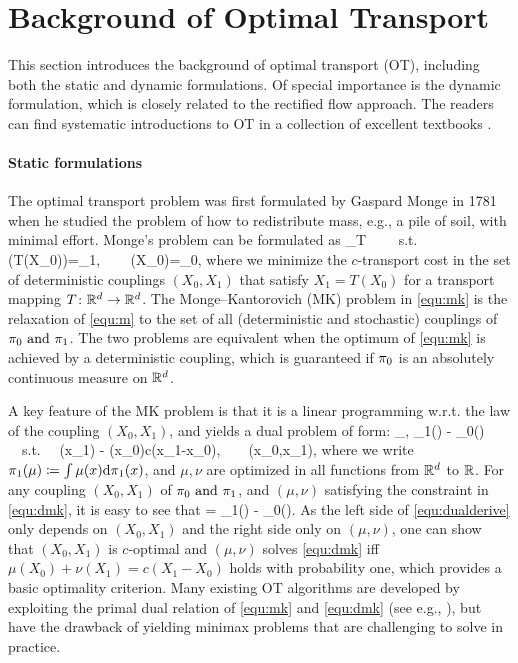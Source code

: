\section{Background of Optimal Transport}
\label{sec:ot}
This section introduces the background of optimal transport (OT), 
including both the static and dynamic formulations.  
Of special importance is the dynamic formulation, 
which is closely related to the rectified flow approach. 
The readers can find systematic introductions to OT in 
a collection of excellent textbooks 
\cite{villani2021topics, figalli2021invitation,   ambrosio2021lectures, peyre2019computational, ollivier2014optimal,
santambrogio2015optimal,
villani2009optimal}.  

\paragraph{Static formulations} 
The optimal transport problem was 
first formulated by 
Gaspard Monge in 1781 when he studied 
 the problem of how to 
 redistribute mass, e.g., a pile of soil, with minimal effort. 
 Monge's problem can be formulated as
 \bbb \label{equ:m}
 \inf_{T}  ~~~~s.t.~~~~ \law(T(X_0))=\tg_1, ~~~ \law(X_0)=\tg_0,
 \eee 
 where we minimize the $c$-transport cost 
 in the set of deterministic couplings $(X_0,X_1)$ that satisfy $X_1 = T(X_0)$ for a transport mapping $T\colon \mathbb{R}^d\to \mathbb{R}^d$. 
The Monge–Kantorovich (MK) problem in \eqref{equ:mk} is the relaxation 
of \eqref{equ:m} to the set of all (deterministic and stochastic) couplings of $\text{${\pi}_0$ and ${\pi}_1$}$.  
The two problems are equivalent when the optimum of \eqref{equ:mk} is achieved by a 
deterministic coupling, which is guaranteed if ${\pi}_0$ is  an absolutely continuous measure on $\mathbb{R}^d$. 

A key feature of the MK problem is that it is
a linear programming w.r.t. the law of the coupling $(X_0,X_1)$, and yields a  dual problem of form: %
\bbb \label{equ:dmk}
\sup_{\mu, \nu} 
\tg_1(\mu)  - \tg_0(\nu) 
~~s.t.~~
 \mu(x_1) - 
\nu(x_0)\leq c(x_1-x_0),~~~~\forall (x_0,x_1),
\eee 
where we write ${\pi}_1(\mu) \coloneqq \int \mu(x) \mathrm{d} {\pi}_1(x)$, and $\mu,\nu$ are optimized in all functions from $\mathbb{R}^d$ to $\mathbb{R}$. 
For any coupling $(X_0,X_1)$ of $\text{${\pi}_0$ and ${\pi}_1$}$, and $(\mu,\nu)$ satisfying the constraint in \eqref{equ:dmk}, it is easy to see that 
\bbb \label{equ:dualderive}
\E[c(X_1-X_0)] 
\geq \E[\mu(X_1) - \nu(X_0)] 
= \tg_1(\mu) - \tg_0(\nu). 
\eee 
As the left side of \eqref{equ:dualderive} 
only depends on $(X_0,X_1)$ and the right side only on $(\mu,\nu)$, one can show that $(X_0,X_1)$ is $c$-optimal  and $(\mu,\nu)$ solves \eqref{equ:dmk} iff 
$\mu(X_0) + \nu(X_1) = c(X_1-X_0)$ 
holds with probability one, which provides a basic optimality criterion. %
Many existing 
OT algorithms are developed by exploiting the primal dual relation of \eqref{equ:mk} and 
\eqref{equ:dmk} 
(see e.g., \cite{korotin2022neural}), but have the drawback of yielding  minimax problems that are challenging to solve in practice. %
 
